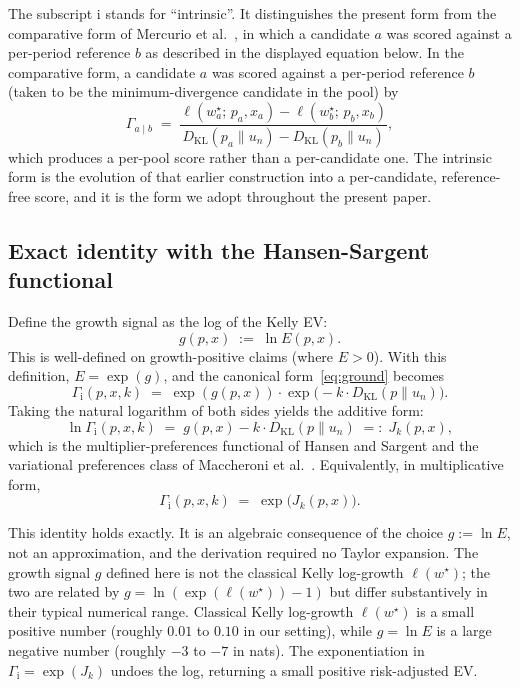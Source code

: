 \documentclass[11pt]{article}
\theoremstyle{definition}
\theoremstyle{remark}
\newcommand{\KL}{D_{\mathrm{KL}}}
\newcommand{\GROUND}{\Gamma_{\mathrm{i}}}
\begin{document}
The subscript $\mathrm{i}$ stands for ``intrinsic''. It distinguishes
the present form from the comparative form of Mercurio et al.\ \cite{mercurio2020binary},
in which a candidate $a$ was scored against a per-period reference
$b$ as described in the displayed equation below.
In the comparative form, a candidate $a$ was scored against a
per-period reference $b$ (taken to be the minimum-divergence
candidate in the pool) by
\begin{equation*}
\Gamma_{a \mid b} \;=\; \frac{\ell(w^\star_a;\, p_a, x_a) - \ell(w^\star_b;\, p_b, x_b)}{\KL(p_a \| u_n) - \KL(p_b \| u_n)},
\end{equation*}
which produces a per-pool score rather than a per-candidate one.
The intrinsic form is the evolution of that earlier construction
into a per-candidate, reference-free score, and it is the form we
adopt throughout the present paper.

\subsection{Exact identity with the Hansen-Sargent functional}

Define the growth signal as the log of the Kelly EV:
\begin{equation}
g(p, x) \;:=\; \ln E(p, x).
\label{eq:gdef}
\end{equation}
This is well-defined on growth-positive claims (where $E > 0$). With
this definition, $E = \exp(g)$, and the canonical
form~\eqref{eq:ground} becomes
\begin{equation*}
\GROUND(p, x, k) \;=\; \exp(g(p, x)) \cdot \exp\bigl(-k \cdot \KL(p \| u_n)\bigr).
\end{equation*}
Taking the natural logarithm of both sides yields the additive form:
\begin{equation}
\ln \GROUND(p, x, k) \;=\; g(p, x) - k \cdot \KL(p \| u_n) \;=:\; J_k(p, x),
\label{eq:Jk}
\end{equation}
which is the multiplier-preferences functional of
Hansen and Sargent \cite{hansen2008robustness} and the variational preferences class
of Maccheroni et al.\ \cite{maccheroni2006ambiguity}. Equivalently, in multiplicative
form,
\begin{equation}
\GROUND(p, x, k) \;=\; \exp\bigl(J_k(p, x)\bigr).
\label{eq:exact-identity}
\end{equation}

This identity holds exactly. It is an algebraic consequence of the
choice $g := \ln E$, not an approximation, and the derivation
required no Taylor expansion. The growth signal $g$ defined here is
not the classical Kelly log-growth $\ell(w^\star)$; the two are
related by $g = \ln(\exp(\ell(w^\star)) - 1)$ but differ
substantively in their typical numerical range. Classical Kelly
log-growth $\ell(w^\star)$ is a small positive number (roughly
$0.01$ to $0.10$ in our setting), while $g = \ln E$ is a large
negative number (roughly $-3$ to $-7$ in nats). The exponentiation
in $\GROUND = \exp(J_k)$ undoes the log, returning a small positive
risk-adjusted EV.
\end{document}
